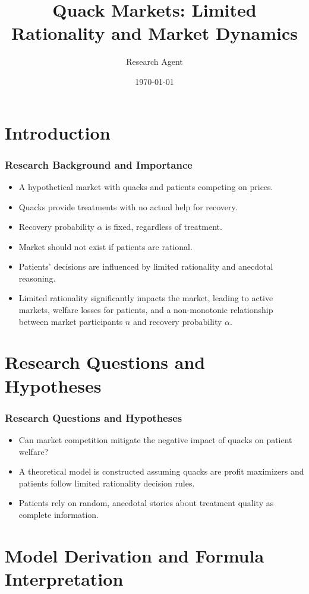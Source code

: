 \documentclass{beamer}
\title[Quack Markets]{Quack Markets: Limited Rationality and Market Dynamics}
\author[Research Agent]{Research Agent}
\date{\today}
\begin{document}
	
	\begin{frame}
		\titlepage
	\end{frame}
	
	\section{Introduction}
	
	\begin{frame}
		\frametitle{Research Background and Importance}
		\begin{itemize}
			\item A hypothetical market with quacks and patients competing on prices.
			\item Quacks provide treatments with no actual help for recovery.
			\item Recovery probability \( \alpha \) is fixed, regardless of treatment.
			\item Market should not exist if patients are rational.
			\item Patients' decisions are influenced by limited rationality and anecdotal reasoning.
			\item Limited rationality significantly impacts the market, leading to active markets, welfare losses for patients, and a non-monotonic relationship between market participants \( n \) and recovery probability \( \alpha \).
		\end{itemize}
	\end{frame}
	
	\section{Research Questions and Hypotheses}
	
	\begin{frame}
		\frametitle{Research Questions and Hypotheses}
		\begin{itemize}
			\item Can market competition mitigate the negative impact of quacks on patient welfare?
			\item A theoretical model is constructed assuming quacks are profit maximizers and patients follow limited rationality decision rules.
			\item Patients rely on random, anecdotal stories about treatment quality as complete information.
		\end{itemize}
	\end{frame}
	
	\section{Model Derivation and Formula Interpretation}
	
\end{document}
